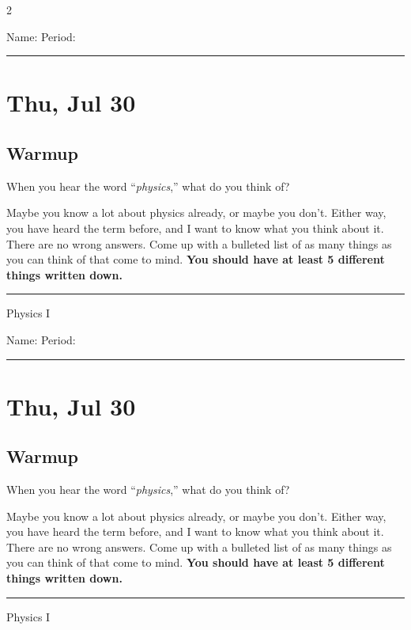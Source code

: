 \documentclass[10pt,landscape]{exam}
\def\todayDate{Thu, Jul 30}
\def\content{
When you hear the word ``\emph{physics},'' what do you think of?   

\hfill

Maybe you know a lot about physics already, or maybe you don't.  Either way, you have heard the term before, and I want to know what you think about it.  There are no wrong answers.  Come up with a bulleted list of as many things as you can think of that come to mind.  \textbf{You should have at least 5 different things written down.}
}
\begin{document}
\pagestyle{empty}

\setlength{\columnsep}{0.8in}
\begin{multicols*}{2}

\noindent  
Name: \hfill Period: \hspace{5em}
\vspace{0.5em}
\hrule

\section*{\todayDate}
\subsection*{Warmup}

\content

\vfill
\hrule
\vspace{0.5em}
\hfill {\sc Physics I}

\columnbreak

\noindent  
Name: \hfill Period: \hspace{5em}
\vspace{0.5em}
\hrule

\section*{\todayDate}
\subsection*{Warmup}

\content

\vfill
\hrule
\vspace{0.5em}
\hfill {\sc Physics I}

\end{multicols*}
\end{document}
